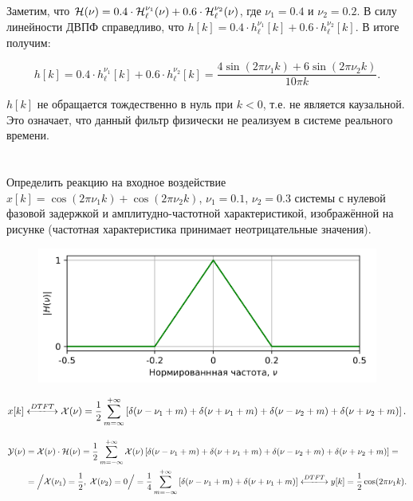 Заметим, что $\mathcal{H}(\nu) = 0.4\cdot \mathcal{H}_{\ell}^{\nu_1}(\nu) + 0.6 \cdot \mathcal{H}_{\ell}^{\nu_2}(\nu)$, где $\nu_1 = 0.4$ и $\nu_2 = 0.2$. 
В силу линейности ДВПФ справедливо, что $h[k] = 0.4 \cdot h_{\ell}^{\nu_1}[k] + 0.6\cdot h_{\ell}^{\nu_2}[k]$. В итоге получим:

\begin{equation*}
	h[k] = 0.4 \cdot h_{\ell}^{\nu_1}[k] + 0.6\cdot h_{\ell}^{\nu_2}[k] = \dfrac{4\sin(2 \pi \nu_1 k) + 6\sin(2 \pi \nu_2 k)}{10\pi k}.
\end{equation*}

$h[k]$ не обращается тождественно в нуль при $k<0$, т.е. не является каузальной. Это означает, что данный фильтр физически не реализуем в системе реального времени. 


\section{}
Определить реакцию на входное воздействие $x[k] = \cos(2\pi \nu_1 k) + \cos(2 \pi \nu_2 k)$, $\nu_1 = 0.1$, $\nu_2 = 0.3$ системы с нулевой фазовой задержкой и амплитудно-частотной характеристикой, изображённой на рисунке (частотная характеристика принимает неотрицательные значения).
\begin{figure}[!h]
	\centering
	\includegraphics[width=0.6\columnwidth]{pics/fall/7/7-3.png}
	\label{fig:7-3}
\end{figure}

\begin{equation*}
	x[k] \xlongleftrightarrow{DTFT} \Capit{X}(\nu) = \dfrac{1}{2}\sum\limits_{m = \infty}^{+\infty}
	\left[\delta(\nu - \nu_1 + m) + \delta(\nu + \nu_1 + m) + \delta(\nu - \nu_2 + m) + \delta(\nu + \nu_2 + m)\right].
\end{equation*}

\begin{align*}
	\Capit{Y}(\nu) &= \Capit{X}(\nu) \cdot \Capit{H}(\nu) = \dfrac{1}{2}\sum\limits_{m = -\infty}^{+\infty}
	\Capit{X}(\nu) \left[\delta(\nu - \nu_1 + m) + \delta(\nu + \nu_1 + m) + \delta(\nu - \nu_2 + m) + \delta(\nu + \nu_2 + m)\right] = \\
	&= \Big\slash \Capit{X}(\nu_1) = \frac{1}{2},\; \Capit{X}(\nu_2) = 0 \Big\slash = \dfrac{1}{4}\sum\limits_{m = -\infty}^{+\infty}
	\left[\delta(\nu - \nu_1 + m) + \delta(\nu + \nu_1 + m)\right] \xlongleftrightarrow{DTFT} 
	y[k] = \dfrac{1}{2}\cos(2 \pi \nu_1 k).
\end{align*}
